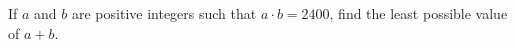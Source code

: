 If $a$ and $b$ are positive integers such that $a \cdot b = 2400$, find the least possible value of $a+b$.